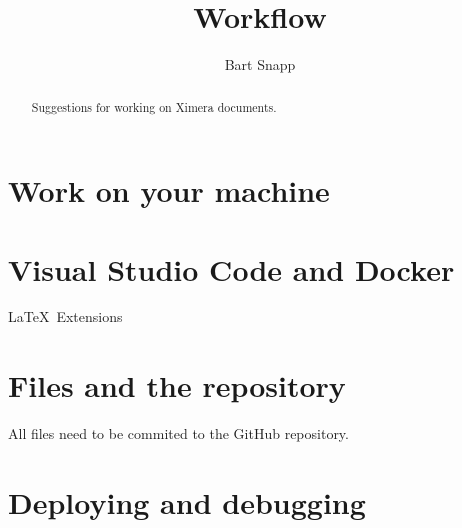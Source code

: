 \documentclass{ximera}
\title{Workflow}
\author{Bart Snapp}
\begin{document}
\begin{abstract}
    Suggestions for working on Ximera documents.
\end{abstract}
\maketitle

\section{Work on your machine}



\section{Visual Studio Code and Docker}

\LaTeX\ Extensions



\section{Files and the repository}

All files need to be commited to the GitHub repository.


\section{Deploying and debugging}
\end{document}
